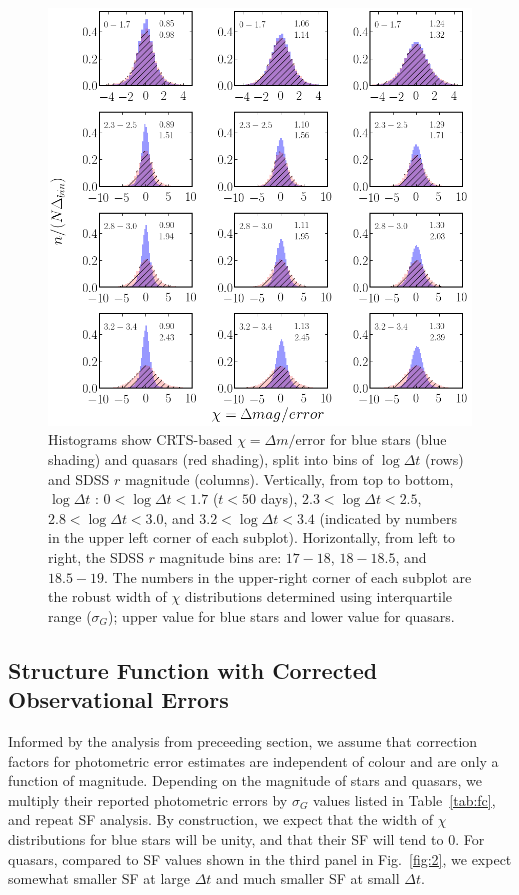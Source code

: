 \documentclass[fleqn,usenatbib]{mnras}
\begin{document}
\begin{figure}
\includegraphics[width=1.1\columnwidth, center]{Fig_3.png}
\vskip -0.15in
\caption{Histograms show CRTS-based $\chi = \Delta m / \mathrm{error}$ for blue stars (blue shading) 
and quasars (red shading), split into bins of $\log{\Delta t}$ (rows) and SDSS $r$ magnitude (columns). 
Vertically, from top to bottom, $\log{\Delta t}$ : $0<\log{\Delta t}<1.7$ ($t < 50 $ days), 
$2.3<\log{\Delta t}<2.5$, $2.8<\log{\Delta t}<3.0$, and $3.2<\log{\Delta t}<3.4$ (indicated by numbers
 in the upper left corner of each subplot). Horizontally, from left to right, the SDSS $r$ magnitude bins are: 
$17-18$,  $18-18.5$, and $18.5-19$. The numbers in the upper-right corner of each subplot are the 
robust width of $\chi$ distributions determined using interquartile range ($\sigma_G$); upper value for
blue stars and lower value for quasars.}
\label{fig:3}
\end{figure}



\subsection{Structure Function with Corrected Observational Errors}

Informed by the analysis from preceeding section, we assume that correction factors for photometric
error estimates are independent of colour and are only a function of magnitude. Depending on the magnitude
of stars and quasars, we multiply their reported photometric errors by $\sigma_G$ values listed in 
Table~\ref{tab:fc}, and repeat SF analysis. By construction, we expect that the width of $\chi$ distributions
for blue stars will be unity, and that their SF will tend to 0. For quasars, compared to SF values shown in the third 
panel in Fig.~\ref{fig:2}, we expect somewhat smaller SF at large $\Delta t$ and much smaller SF at small $\Delta t$. 
\end{document}
